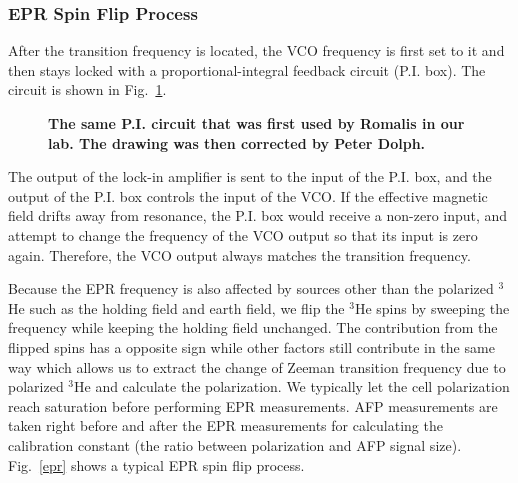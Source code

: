\subsubsection{EPR Spin Flip Process}

After the transition frequency is located, the VCO frequency is first set to it and then stays locked with a proportional-integral feedback circuit (P.I. box). The circuit is shown in Fig.~\ref{PIBox}. 

\begin{figure}[t!]
	\centering
	\caption{{\bf The same P.I. circuit that was first used by Romalis in our lab. The drawing was then corrected by Peter Dolph.\cite{PeterThesis}}}
	\label{PIBox}
\end{figure}

The output of the lock-in amplifier is sent to the input of the P.I. box, and the output of the P.I. box controls the input of the VCO. If the effective magnetic field drifts away from resonance, the P.I. box would receive a non-zero input, and attempt to change the frequency of the VCO output so that its input is zero again. Therefore, the VCO output always matches the transition frequency.

Because the EPR frequency is also affected by sources other than the polarized $^{3}$He such as the holding field and earth field, we flip the $^{3}$He spins by sweeping the frequency while keeping the holding field unchanged. The contribution from the flipped spins has a opposite sign while other factors still contribute in the same way which allows us to extract the change of Zeeman transition frequency due to polarized $^{3}$He and calculate the polarization. We typically let the cell polarization reach saturation before performing EPR measurements. AFP measurements are taken right before and after the EPR measurements for calculating the calibration constant (the ratio between polarization and AFP signal size). Fig.~\ref{epr} shows a typical EPR spin flip process.

